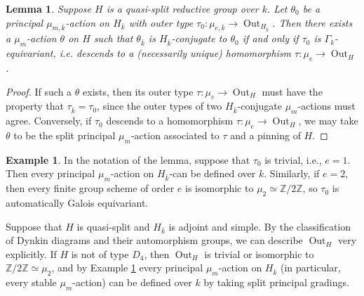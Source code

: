 \documentclass{article} %
\newtheorem{lemma}[proposition]{Lemma}
\numberwithin{equation}{section}
\theoremstyle{definition}
\newtheorem{example}[proposition]{Example}
\DeclareMathOperator{\Out}{Out}
\newcommand{\Z}{\mathbb{Z}}
\begin{document}
\begin{lemma}\label{lemma: mum-action descends if and only if outer type descends}
    Suppose $H$ is a quasi-split reductive group over $k$.
    Let $\theta_0$ be a principal $\mu_{m,\bar{k}}$-action on $H_{\bar{k}}$ with outer type $\tau_0\colon \mu_{e,\bar{k}}\rightarrow \Out_{H_{\bar{k}}}$.
    Then there exists a $\mu_m$-action $\theta$ on $H$ such that $\theta_{\bar{k}}$ is $H_{\bar{k}}$-conjugate to $\theta_0$ if and only if $\tau_0$ is $\Gamma_k$-equivariant, i.e. descends to a (necessarily unique) homomorphism $\tau\colon \mu_e\rightarrow \Out_H$.
\end{lemma}
\begin{proof}
    If such a $\theta$ exists, then its outer type $\tau\colon \mu_e\rightarrow \Out_H$ must have the property that $\tau_{\bar{k}} = \tau_0$, since the outer types of two $H_{\bar{k}}$-conjugate $\mu_m$-actions must agree.
    Conversely, if $\tau_0$ descends to a homomorphism $\tau\colon \mu_e\rightarrow \Out_H$, we may take $\theta$ to be the split principal $\mu_m$-action associated to $\tau$ and a pinning of $H$.
\end{proof}


\begin{example}\label{example: field of definition gradings outer type 1 or 2}
    In the notation of the lemma, suppose that $\tau_0$ is trivial, i.e., $e=1$.
    Then every principal $\mu_m$-action on $H_{\bar{k}}$-can be defined over $k$.
    Similarly, if $e=2$, then every finite group scheme of order $e$ is isomorphic to $\mu_2\simeq \Z/2\Z$, so $\tau_0$ is automatically Galois equivariant.
\end{example}


Suppose that $H$ is quasi-split and $H_{\bar{k}}$ is adjoint and simple. 
    By the classification of Dynkin diagrams and their automorphism groups, we can describe $\Out_H$ very explicitly. 
    If $H$ is not of type $D_4$, then $\Out_H$ is trivial or isomorphic to $\Z/2\Z\simeq \mu_2$, and by Example \ref{example: field of definition gradings outer type 1 or 2} every principal $\mu_m$-action on $H_{\bar{k}}$ (in particular, every stable $\mu_m$-action) can be defined over $k$ by taking split principal gradings.
\end{document}
